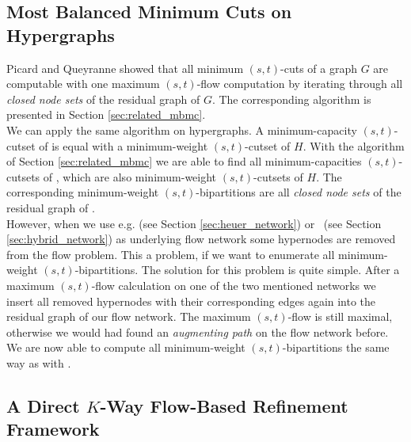 \subsection{Most Balanced Minimum Cuts on Hypergraphs}
\label{sec:mbmc_hypergraphs}

Picard and Queyranne \cite{picard1980structure} showed that all minimum $(s,t)$-cuts 
of a graph $G$ are computable with one maximum $(s,t)$-flow computation by 
iterating through all \emph{closed node sets} of the residual graph of $G$. 
The corresponding algorithm is presented in Section \ref{sec:related_mbmc}. \\
We can apply the same algorithm on hypergraphs. A minimum-capacity $(s,t)$-cutset of 
is equal with a minimum-weight $(s,t)$-cutset of $H$. With the algorithm
of Section \ref{sec:related_mbmc} we are able to find all minimum-capacities
$(s,t)$-cutsets of , which are also minimum-weight $(s,t)$-cutsets
of $H$. The corresponding minimum-weight $(s,t)$-bipartitions are all
\emph{closed node sets} of the residual graph of . \\
However, when we use e.g.  (see Section \ref{sec:heuer_network})
or \ShortHybrid~(see Section \ref{sec:hybrid_network}) as underlying flow network
some hypernodes are removed from the flow problem. This a problem, if we want to
enumerate all minimum-weight $(s,t)$-bipartitions. The solution for 
this problem is quite simple. After a maximum $(s,t)$-flow calculation
on one of the two mentioned networks we insert all removed hypernodes with
their corresponding edges again into the residual graph of our flow network.
The maximum $(s,t)$-flow is still maximal, otherwise we would had found an \emph{augmenting
path} on the flow network before. We are now able to compute all minimum-weight
$(s,t)$-bipartitions the same way as with .

\subsection{A Direct $K$-Way Flow-Based Refinement Framework}
\label{sec:flow_local_search_hypergraph}

